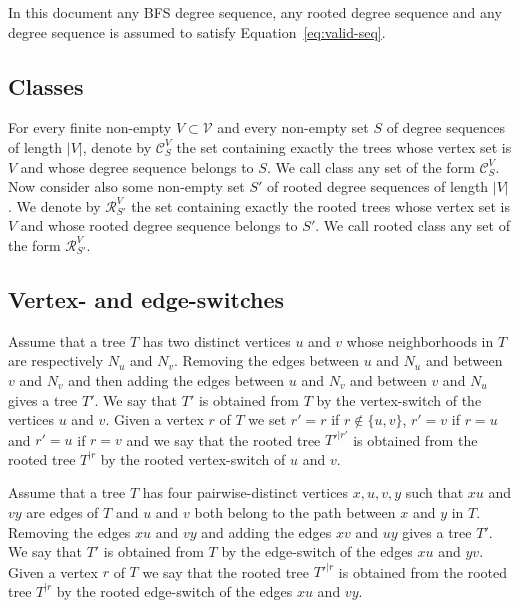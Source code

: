 \documentclass[11 pt]{modarticle}
\newcommand{\vset}{\mathcal{V}}
\newcommand{\size}[1]{|#1|}
\newcommand{\rtree}[2]{{#1}^{\lvert #2}}
\newcommand{\tclass}{\mathcal{C}}
\newcommand{\rtclass}{\mathcal{R}}
\newcommand{\pclass}[2]{\tclass^{#1}_{#2}}
\newcommand{\rpclass}[2]{\rtclass^{#1}_{#2}}
\begin{document}
In this document any BFS degree sequence, any rooted degree sequence and any degree sequence is assumed to satisfy Equation~\eqref{eq:valid-seq}.

\subsection{Classes}

\begin{defi}
For every finite non-empty $V \subset \vset$ and every non-empty set $S$ of degree sequences of length $\size{V}$, denote by $\pclass{V}{S}$ the set containing exactly the trees whose vertex set is $V$ and whose degree sequence belongs to $S$. We call class any set of the form $\pclass{V}{S}$. Now consider also some non-empty set $S'$ of rooted degree sequences of length $\size{V}$. We denote by $\rpclass{V}{S'}$ the set containing exactly the rooted trees whose vertex set is $V$ and whose rooted degree sequence belongs to $S'$. We call rooted class any set of the form $\rpclass{V}{S'}$.
\end{defi}

\subsection{Vertex- and edge-switches}

\begin{defi}
Assume that a tree $T$ has two distinct vertices $u$ and $v$ whose neighborhoods in $T$ are respectively $N_u$ and $N_v$. Removing the edges between $u$ and $N_u$ and between $v$ and $N_v$ and then adding the edges between $u$ and $N_v$ and between $v$ and $N_u$ gives a tree $T'$. We say that $T'$ is obtained from $T$ by the vertex-switch of the vertices $u$ and $v$. Given a vertex $r$ of $T$ we set $r' = r$ if $r \notin \{u,v\}$, $r' = v$ if $r = u$ and $r' = u$ if $r = v$ and we say that the rooted tree $\rtree{T'}{r'}$ is obtained from the rooted tree $\rtree{T}{r}$ by the rooted vertex-switch of $u$ and $v$.
\end{defi}

\begin{defi}
Assume that a tree $T$ has four pairwise-distinct vertices $x,u,v,y$ such that $xu$ and $vy$ are edges of $T$ and $u$ and $v$ both belong to the path between $x$ and $y$ in $T$. Removing the edges $xu$ and $vy$ and adding the edges $xv$ and $uy$ gives a tree $T'$. We say that $T'$ is obtained from $T$ by the edge-switch of the edges $xu$ and $yv$. Given a vertex $r$ of $T$ we say that the rooted tree $\rtree{T'}{r}$ is obtained from the rooted tree $\rtree{T}{r}$ by the rooted edge-switch of the edges $xu$ and $vy$.
\end{defi}
\end{document}
